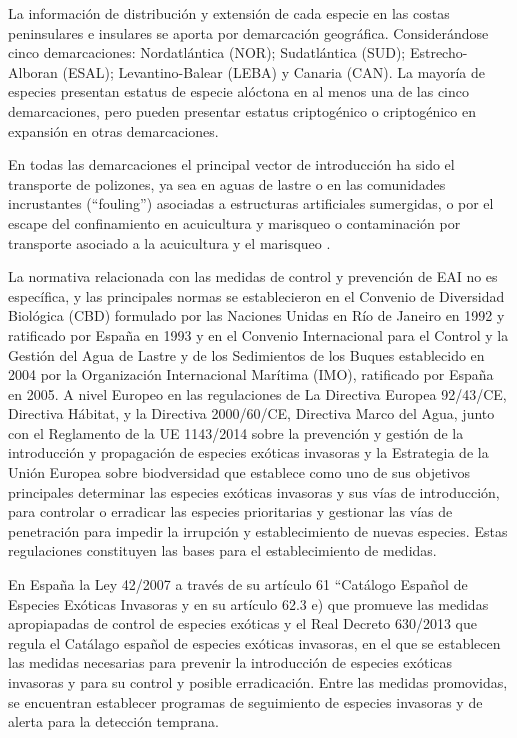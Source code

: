 \documentclass{article}
\begin{document}
La información de distribución y extensión de cada especie en las costas peninsulares e insulares se aporta por demarcación geográfica. Considerándose cinco demarcaciones: Nordatlántica (NOR); Sudatlántica (SUD); Estrecho-Alboran (ESAL); Levantino-Balear (LEBA) y Canaria (CAN). La mayoría de especies presentan estatus de especie alóctona en al menos una de las cinco demarcaciones, pero pueden presentar estatus criptogénico o criptogénico en expansión en otras demarcaciones.\par 
En todas las demarcaciones el principal vector de introducción ha sido el transporte de polizones, ya sea en aguas de lastre  o en las comunidades incrustantes (“fouling”) asociadas a estructuras artificiales sumergidas, o por el escape del confinamiento en acuicultura y marisqueo o contaminación por transporte asociado a la acuicultura y el marisqueo \cite{2}.\par 
La normativa relacionada con las medidas de control y prevención de EAI no es específica, y las principales normas se establecieron en el Convenio de Diversidad Biológica (CBD) formulado por las Naciones Unidas en Río de Janeiro en 1992 y ratificado por España en 1993 y  en el Convenio Internacional para el Control y la Gestión del Agua de Lastre y de los Sedimientos de los Buques establecido en 2004 por la Organización Internacional Marítima (IMO), ratificado por España en 2005. A nivel Europeo en las regulaciones de La Directiva Europea 92/43/CE, Directiva Hábitat, y la Directiva 2000/60/CE, Directiva Marco del Agua, junto con el Reglamento de la UE 1143/2014 sobre la prevención y gestión de la introducción y propagación de especies exóticas invasoras y la Estrategia de la Unión Europea sobre biodversidad que establece como uno de sus objetivos principales determinar las especies exóticas invasoras y sus vías de introducción, para controlar o erradicar las especies prioritarias y gestionar las vías de penetración para impedir la irrupción y establecimiento de nuevas especies. Estas regulaciones constituyen las bases para el establecimiento de medidas.\par
En España la Ley 42/2007 a través de su artículo 61 “Catálogo Español de Especies Exóticas Invasoras y en su artículo 62.3 e) que promueve las medidas apropiapadas de control de especies exóticas y el Real Decreto 630/2013 que regula el Catálago español de especies exóticas invasoras, en el que se establecen las medidas necesarias para prevenir la introducción de especies exóticas invasoras y para su control y posible erradicación. Entre las medidas promovidas, se encuentran establecer programas de seguimiento de especies invasoras y de alerta para la detección temprana.\par 
\end{document}

